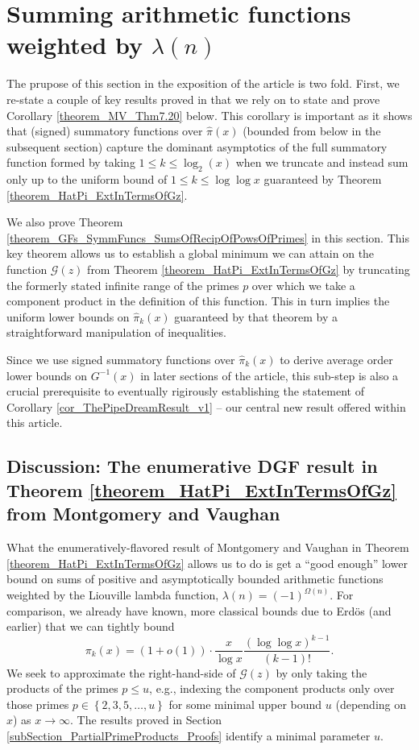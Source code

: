 \documentclass[11pt,reqno,a4letter]{article}
\numberwithin{figure}{section}
\numberwithin{table}{section}
\theoremstyle{plain}
\numberwithin{theorem}{section}
\theoremstyle{definition}
\begin{document}
\newpage 
\section{Summing arithmetic functions weighted by $\lambda(n)$} 
\label{Section_MVCh7_GzBounds} 

The prupose of this section in the exposition of the article is two fold. 
First, we re-state a couple of key results proved in \cite[\S 7.4]{MV} that we rely on 
to state and prove Corollary \ref{theorem_MV_Thm7.20} below. This corollary is important as it shows 
that (signed) summatory functions over $\widehat{\pi}(x)$ (bounded from below in the subsequent section) 
capture the dominant asymptotics of the full summatory function formed by taking $1 \leq k \leq \log_2(x)$ when 
we truncate and instead sum only up to the uniform bound of $1 \leq k \leq \log\log x$ guaranteed by 
Theorem \ref{theorem_HatPi_ExtInTermsOfGz}. 

We also prove 
Theorem \ref{theorem_GFs_SymmFuncs_SumsOfRecipOfPowsOfPrimes} in this section. 
This key theorem allows us to establish a global minimum we can attain on the function $\mathcal{G}(z)$ from 
Theorem \ref{theorem_HatPi_ExtInTermsOfGz} by truncating the formerly stated infinite 
range of the primes $p$ over which we take a component product in the definition of this function. 
This in turn implies the uniform lower bounds on $\widehat{\pi}_k(x)$ guaranteed by that theorem by 
a straightforward manipulation of inequalities. 

Since we use signed summatory functions over 
$\widehat{\pi}_k(x)$ to derive average order lower bounds on $G^{-1}(x)$ in later sections of the article, 
this sub-step is also a crucial prerequisite to eventually rigirously establishing the statement of 
Corollary \ref{cor_ThePipeDreamResult_v1} -- 
our central new result offered within this article. 

\subsection{Discussion: The enumerative DGF result in Theorem \ref{theorem_HatPi_ExtInTermsOfGz} from 
            Montgomery and Vaughan} 
\label{subSection_MVPrereqResultStmts} 

What the enumeratively-flavored result of Montgomery and Vaughan 
in Theorem \ref{theorem_HatPi_ExtInTermsOfGz} allows us to do is get a 
``good enough'' lower bound on sums of positive and asymptotically bounded arithmetic functions 
weighted by the Liouville lambda function, $\lambda(n) = (-1)^{\Omega(n)}$. 
For comparison, we already have known, more classical bounds due to Erd\"os (and earlier) that 
we can tightly bound \cite{ERDOS-PRIMEK-FUNC,MV} 
\[
\pi_k(x) = (1 + o(1)) \cdot \frac{x}{\log x} \frac{(\log\log x)^{k-1}}{(k-1)!}. 
\] 
We seek to approximate the right-hand-side of $\mathcal{G}(z)$ by only taking the products of the primes 
$p \leq u$, e.g., indexing the component products only over those primes 
$p \in \left\{2,3,5,\ldots,u\right\}$ for some minimal upper bound $u$ (depending on $x$) 
as $x \rightarrow \infty$. 
The results proved in Section \ref{subSection_PartialPrimeProducts_Proofs} identify a minimal parameter $u$. 
\end{document}
